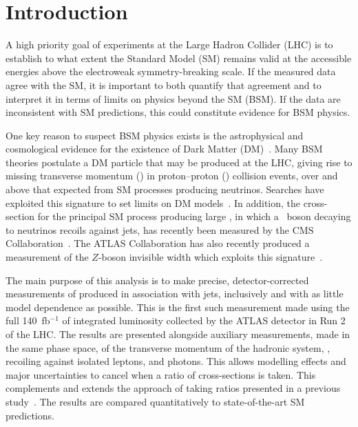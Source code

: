 \documentclass[atlasdraft=false, cernpreprint, UKenglish, texmf, orcidlogo]{atlasdoc}
\author{The ATLAS Collaboration}
\begin{document}
 
\maketitle
 
\tableofcontents
 
 

\newpage
\section{Introduction}
\label{sec:intro}
 
A high priority goal of experiments at the Large Hadron Collider (LHC) is to
establish to what extent the Standard Model (SM) remains valid at the accessible energies
above the electroweak symmetry-breaking scale.
If the measured data agree with the SM, it is important to both quantify that agreement and to
interpret it in terms of limits on physics beyond the SM (BSM).
If the data are inconsistent with SM predictions, this could constitute evidence for BSM physics.
 
One key reason to suspect BSM physics exists is the astrophysical and cosmological evidence
for the existence of Dark Matter (DM)~\cite{Bertone:2004pz,Trimble:1987ee,Feng:2010gw}. Many BSM theories postulate a DM particle that
may be produced at the LHC, giving rise to missing transverse
momentum (\ptmiss) in proton--proton (\pp) collision events, over and above that expected from SM processes producing neutrinos.
Searches have exploited this signature to set limits on DM models~\cite{ATLAS:2021kxv,CMS:2021far}. In addition, the cross-section for the
principal SM process producing large \ptmiss, in which a \Z\ boson decaying to neutrinos recoils against jets, has recently been
measured by the CMS Collaboration~\cite{CMS-SMP-18-003}. The ATLAS Collaboration has also recently produced a measurement of the
$Z$-boson invisible width which exploits this signature~\cite{ATLAS:2023ynf}.
 
The main purpose of this analysis is to make precise, detector-corrected measurements of \ptmiss produced in association with jets, inclusively and
with as little model dependence as possible. This is the first such measurement made using the full 140~fb$^{-1}$ of integrated luminosity collected by the ATLAS
detector in Run 2 of the LHC\@. The results are presented alongside auxiliary measurements, made in the same phase space,
of the transverse momentum of the hadronic system, \ptrecoil, recoiling against isolated leptons, and photons.
This allows modelling effects and major uncertainties to cancel when a ratio of cross-sections is taken.
This complements and extends the approach of taking ratios presented in a previous study~\cite{EXOT-2016-03}.
The results are compared quantitatively to state-of-the-art SM predictions.
 
\end{document}
